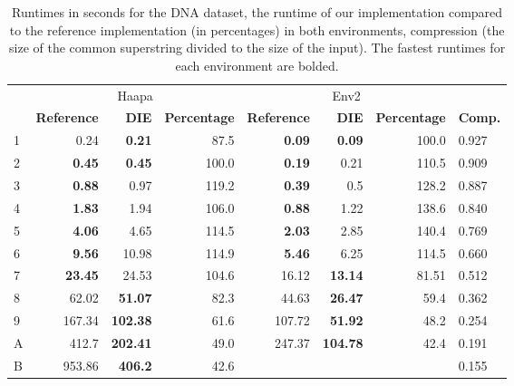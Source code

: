 \documentclass[english,twoside,censored,csm,algorithms-track-2020]{HYthesisML}
\theoremstyle{plain}
\theoremstyle{definition}
\numberwithin{testexample}{chapter}
\begin{document}
\begin{center}
  \begin{table}[t]
  \hspace{-1cm}
  \begin{tabular} {|l|r r r|r r r|l|}
    \hline
     & \multicolumn{3}{c}{Haapa} & \multicolumn{3}{c}{Env2} & \\
     \textbf{\text{\#}} & \textbf{Reference} & \textbf{DIE} & \textbf{Percentage}  & \textbf{Reference} & \textbf{DIE} & \textbf{Percentage} & \textbf{Comp.} \\
     \hline
     1 & 0.24            & \textbf{0.21}   & 87.5   & \textbf{0.09}  & \textbf{0.09}   & 100.0           & 0.927 \\
     2 & \textbf{0.45}   & \textbf{0.45}   & 100.0  & \textbf{0.19}  & 0.21            & 110.5           & 0.909 \\
     3 & \textbf{0.88}   & 0.97            & 119.2  & \textbf{0.39}  & 0.5             & 128.2           & 0.887 \\
     4 & \textbf{1.83}   & 1.94            & 106.0  & \textbf{0.88}  & 1.22            & 138.6           & 0.840 \\
     5 & \textbf{4.06}   & 4.65            & 114.5  & \textbf{2.03}  & 2.85            & 140.4           & 0.769 \\
     6 & \textbf{9.56}   & 10.98           & 114.9  & \textbf{5.46}  & 6.25            & 114.5           & 0.660 \\
     7 & \textbf{23.45}  & 24.53           & 104.6  & 16.12          & \textbf{13.14}  & 81.51           & 0.512 \\
     8 & 62.02           & \textbf{51.07}  & 82.3   & 44.63          & \textbf{26.47}  & 59.4            & 0.362 \\
     9 & 167.34          & \textbf{102.38} & 61.6   & 107.72         & \textbf{51.92}  & 48.2            & 0.254 \\
     A & 412.7           & \textbf{202.41} & 49.0   & 247.37         & \textbf{104.78} & 42.4            & 0.191 \\
     B & 953.86          & \textbf{406.2}  & 42.6   &                &                 &                 & 0.155 \\
\hline

  \end{tabular}
  \caption{Runtimes in seconds for the DNA dataset, the runtime of our implementation compared to the reference implementation (in percentages) in both environments, compression (the size of the common superstring divided to the size of the input). The fastest runtimes for each environment are bolded.}
  \label{runtimes-dna}
  \end{table}
\end{center}
\end{document}
